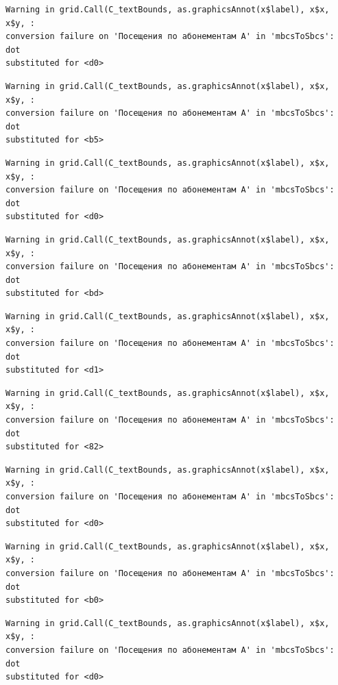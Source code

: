 \documentclass[
  letterpaper,
  DIV=11,
  numbers=noendperiod]{scrartcl}
\begin{document}
\begin{verbatim}
Warning in grid.Call(C_textBounds, as.graphicsAnnot(x$label), x$x, x$y, :
conversion failure on 'Посещения по абонементам А' in 'mbcsToSbcs': dot
substituted for <d0>
\end{verbatim}

\begin{verbatim}
Warning in grid.Call(C_textBounds, as.graphicsAnnot(x$label), x$x, x$y, :
conversion failure on 'Посещения по абонементам А' in 'mbcsToSbcs': dot
substituted for <b5>
\end{verbatim}

\begin{verbatim}
Warning in grid.Call(C_textBounds, as.graphicsAnnot(x$label), x$x, x$y, :
conversion failure on 'Посещения по абонементам А' in 'mbcsToSbcs': dot
substituted for <d0>
\end{verbatim}

\begin{verbatim}
Warning in grid.Call(C_textBounds, as.graphicsAnnot(x$label), x$x, x$y, :
conversion failure on 'Посещения по абонементам А' in 'mbcsToSbcs': dot
substituted for <bd>
\end{verbatim}

\begin{verbatim}
Warning in grid.Call(C_textBounds, as.graphicsAnnot(x$label), x$x, x$y, :
conversion failure on 'Посещения по абонементам А' in 'mbcsToSbcs': dot
substituted for <d1>
\end{verbatim}

\begin{verbatim}
Warning in grid.Call(C_textBounds, as.graphicsAnnot(x$label), x$x, x$y, :
conversion failure on 'Посещения по абонементам А' in 'mbcsToSbcs': dot
substituted for <82>
\end{verbatim}

\begin{verbatim}
Warning in grid.Call(C_textBounds, as.graphicsAnnot(x$label), x$x, x$y, :
conversion failure on 'Посещения по абонементам А' in 'mbcsToSbcs': dot
substituted for <d0>
\end{verbatim}

\begin{verbatim}
Warning in grid.Call(C_textBounds, as.graphicsAnnot(x$label), x$x, x$y, :
conversion failure on 'Посещения по абонементам А' in 'mbcsToSbcs': dot
substituted for <b0>
\end{verbatim}

\begin{verbatim}
Warning in grid.Call(C_textBounds, as.graphicsAnnot(x$label), x$x, x$y, :
conversion failure on 'Посещения по абонементам А' in 'mbcsToSbcs': dot
substituted for <d0>
\end{verbatim}
\end{document}
